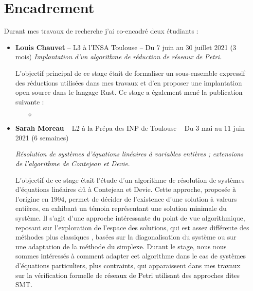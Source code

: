 \begin{mdframed}
\end{mdframed}



\vspace{10pt}
\section{Encadrement}
\vspace{10pt}

Durant mes travaux de recherche j'ai co-encadré deux étudiants :

\begin{itemize}
  \item \textbf{Louis Chauvet} -- L3 à l'INSA Toulouse -- Du 7 juin au 30 juillet 2021 (3 mois)
  \smallbreak
  \textit{Implantation d'un algorithme de réduction de réseaux de Petri.}
  \begin{mdframed}
    L'objectif principal de ce stage était de formaliser un sous-ensemble
    expressif des réductions utilisées dans mes travaux et d'en proposer une
    implantation open source dans le langage
    Rust. Ce stage a également mené
    la publication suivante :
    \begin{itemize}
      \item[$\diamond$] 
    \end{itemize}
  \end{mdframed}
  \newpage
  \item \textbf{Sarah Moreau} -- L2 à la Prépa des INP de Toulouse -- Du 3 mai au 11 juin 2021 (6 semaines)
  
  \smallbreak
  \textit{Résolution de systèmes d'équations linéaires à variables entières ; extensions de l'algorithme de Contejean et Devie.}
  \begin{mdframed}
    L'objectif de ce stage était l'étude d'un algorithme de résolution de systèmes
    d'équations linéaires dû à Contejean et Devie. Cette approche, proposée à
    l'origine en 1994, permet de décider de l'existence d'une solution à valeurs
    entières, en exhibant un témoin représentant une solution minimale du système.
    Il s'agit d'une approche intéressante du point de vue algorithmique, reposant
    sur l'exploration de l'espace des solutions, qui est assez différente des
    méthodes \og plus classiques \fg, basées sur la diagonalisation du système ou sur
    une adaptation de la méthode du simplexe. Durant le stage, nous nous sommes
    intéressés à comment adapter cet algorithme dans le cas de systèmes
    d'équations particuliers, plus contraints, qui apparaissent dans mes travaux
    sur la vérification formelle de réseaux de Petri utilisant des
    approches dites SMT. 
  \end{mdframed}
\end{itemize}








